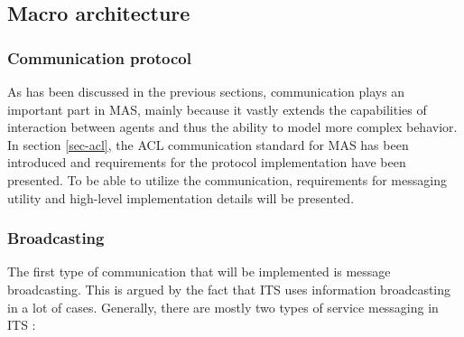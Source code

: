 \documentclass[0main.tex]{subfiles}
\begin{document}

\pagebreak



\subsection{Macro architecture}

\subsubsection{Communication protocol}

As has been discussed in the previous sections, communication plays an important part in 
MAS, mainly because it vastly extends the capabilities of interaction between agents and thus 
the ability to model more complex behavior. In section \ref{sec-acl}, the ACL communication 
standard for MAS has been introduced and requirements for the protocol implementation have 
been presented. To be able to 
utilize the communication, requirements for messaging utility and high-level implementation 
details will be presented. 

\subsubsection{Broadcasting}

The first type of communication that will be implemented is message broadcasting. This is 
argued by the fact that ITS uses information broadcasting in a lot of cases.
Generally, there are mostly two types of service messaging in ITS \cite{Santa2013}:
\end{document}
